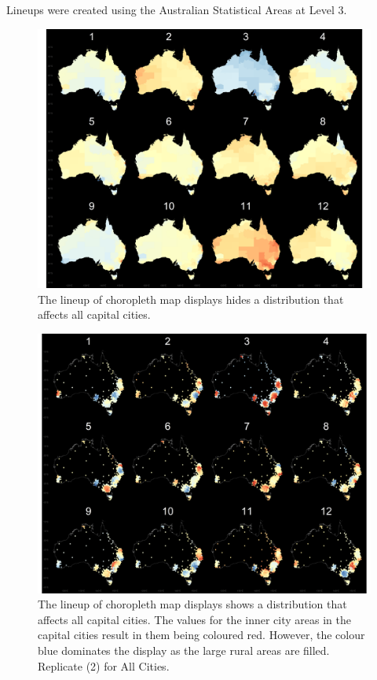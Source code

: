 \documentclass[conference,final,]{IEEEtran}
\makeatletter
\def\maxwidth{\ifdim\Gin@nat@width>\linewidth\linewidth
\else\Gin@nat@width\fi}
\let\Oldincludegraphics\includegraphics
\renewcommand{\includegraphics}[1]{\Oldincludegraphics[width=\maxwidth]{#1}}
\makeatother
\begin{document}
Lineups were created using the Australian Statistical Areas at Level 3.

\begin{figure}
\centering
\includegraphics{figures/aus_cities_3_geo.png}
\caption{The lineup of choropleth map displays hides a distribution that affects all capital cities.}
\end{figure}

\begin{figure}
\centering
\includegraphics{figures/aus_cities_3_hex.png}
\caption{The lineup of choropleth map displays shows a distribution that affects all capital cities. The values for the inner city areas in the capital cities result in them being coloured red. However, the colour blue dominates the display as the large rural areas are filled. Replicate (2) for All Cities.}
\end{figure}
\end{document}
